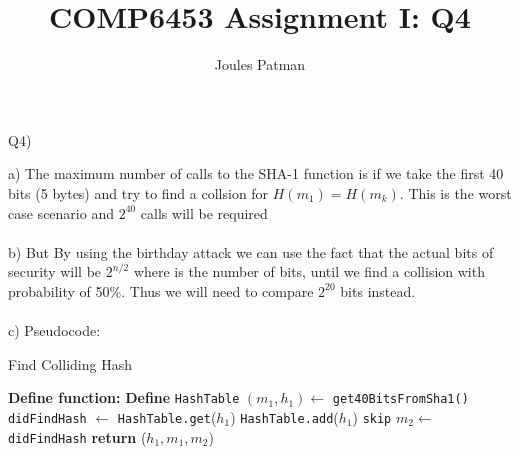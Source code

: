 \documentclass{article}
\title{COMP6453 Assignment I: Q4}
\author{Joules Patman}
\begin{document}
\maketitle


Q4)

a)
The maximum number of calls to the SHA-1 function is if we take the first 40 bits (5 bytes) 
and try to find a collsion for $H(m_1) = H(m_k)$. This is the worst case 
scenario and $2^{40}$ calls will be required
\\
\\
b)
But By using the birthday attack we can use the fact that the actual bits of security will be $2^{n/2}$
where is the number of bits, until we find a collision with probability of 50\%. Thus we will need to 
compare $2^{20}$ bits instead.
\\
\\

c) Pseudocode:
\begin{algorithm}
\caption{Find Colliding Hash}
\begin{algorithmic}[1]
\STATE \textbf{Define function:}
\STATE \hspace{1em} \textbf{Define} \texttt{HashTable} 
\STATE \hspace{1em} $(m_1, h_1) \leftarrow$ \texttt{get40BitsFromSha1()}
\STATE \hspace{1em} \texttt{didFindHash} $\leftarrow$ \texttt{HashTable.get}($h_1$)
    \STATE \hspace{2em} \texttt{HashTable.add}($h_1$)
    \STATE \hspace{2em} \texttt{skip}
\ELSE
    \STATE \hspace{2em} $m_2 \leftarrow$ \texttt{didFindHash}
\ENDIF
\STATE \textbf{return} ($h_1, m_1, m_2$)
\end{algorithmic}
\end{algorithm}






\end{document}
